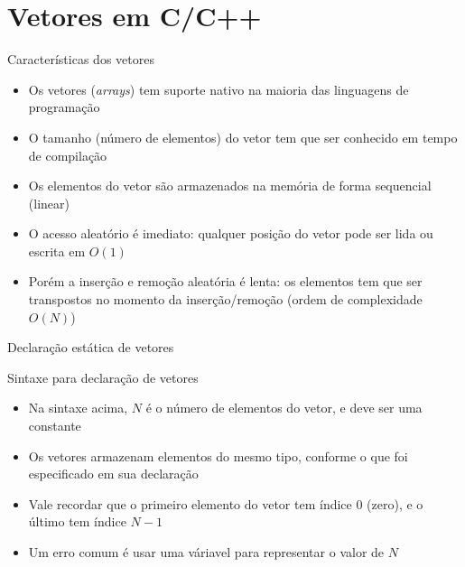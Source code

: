 \section{Vetores em C/C++}

\begin{frame}[fragile]{Características dos vetores}

	\begin{itemize}
		\item Os vetores (\textit{arrays}) tem suporte nativo na maioria das linguagens de 
        programação

		\item O tamanho (número de elementos) do vetor tem que ser conhecido em tempo de compilação

		\item Os elementos do vetor são armazenados na memória de forma sequencial (linear)

		\item O acesso aleatório é imediato: qualquer posição do vetor pode ser lida ou escrita
		em $O(1)$

		\item Porém a inserção e remoção aleatória é lenta: os elementos tem que ser transpostos no         momento da inserção/remoção (ordem de complexidade $O(N)$)
	\end{itemize}

\end{frame} 

\begin{frame}[fragile]{Declaração estática de vetores}

    \begin{block}{Sintaxe para declaração de vetores}
    \end{block}

	\begin{itemize}
		\item Na sintaxe acima, $N$ é o número de elementos do vetor, e deve ser 
        uma constante

		\item Os vetores armazenam elementos do mesmo tipo, conforme o que foi especificado em sua 
        declaração

        \item Vale recordar que o primeiro elemento do vetor tem índice 0 (zero), e o último tem
        índice $N - 1$

        \item Um erro comum é usar uma váriavel para representar o valor de $N$
	\end{itemize}

\end{frame}

